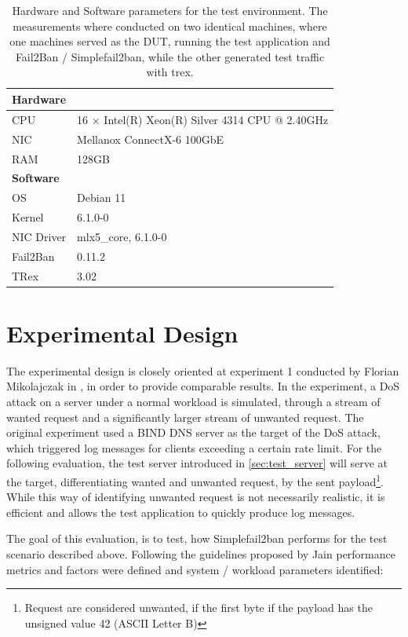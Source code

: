 \begin{table}[b!]
	\renewcommand{\arraystretch}{1.5}
	\caption[Testbed Summary]{Hardware and Software parameters for the test environment. The measurements where conducted
	on two identical machines, where one machines served as the \ac{DUT}, running the test application and Fail2Ban / Simplefail2ban,
	while the other generated test traffic with trex.}
	\label{tab:specs}
	 \centering
	\small
	\begin{tabular}{ll}
	\toprule
	\multicolumn{2}{l}{\textbf{Hardware}}                                        \\ \midrule
	CPU      & 16 $\times$ Intel(R) Xeon(R) Silver 4314 CPU @ 2.40GHz \\
	NIC      & Mellanox ConnectX-6 100GbE                       \\
	RAM        & 128GB                                                       \\ \bottomrule
	\multicolumn{2}{l}{\textbf{Software}}                                        \\ \midrule
	OS         & Debian 11                                                  \\
	Kernel          & 6.1.0-0                                                   \\
	NIC Driver & mlx5\_core, 6.1.0-0                                      \\
	Fail2Ban       & 0.11.2                                     \\
	TRex            & 3.02                                       \\ \bottomrule
	\end{tabular}
\end{table}

\section{Experimental Design}

The experimental design is closely oriented at experiment 1 conducted by Florian Mikolajczak in \cite{mikolajczak2022}, in order to provide comparable results.
In the experiment, a \ac{DoS} attack on a server under a normal workload is simulated, through a stream of wanted request and a significantly larger
stream of unwanted request. The original experiment used a BIND DNS server as the target of the \ac{DoS} attack, which triggered log messages for clients exceeding a certain rate limit. For   
the following evaluation, the test server introduced in \ref{sec:test_server} will serve at the target, differentiating wanted and unwanted request, by the sent payload\footnote{Request are considered unwanted, if the first byte if the payload has the unsigned value 42 (ASCII Letter B)}.
While this way of identifying unwanted request is not necessarily realistic, it is efficient and allows the test application to quickly produce log messages.
\par
The goal of this evaluation, is to test, how Simplefail2ban performs for the test scenario described above. 
Following the guidelines proposed by Jain \cite{jain:art} performance metrics and factors were defined and system / workload parameters identified:  


